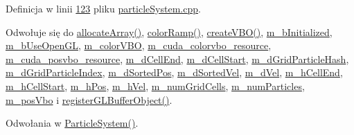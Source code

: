 Definicja w linii \hyperlink{particle_system_8cpp_source_l00123}{123} pliku \hyperlink{particle_system_8cpp_source}{particle\-System.\-cpp}.



Odwołuje się do \hyperlink{particle_system_8cuh_aee51e01a5233e0fda578bd5b3bc38e8f}{allocate\-Array()}, \hyperlink{particle_system_8cpp_source_l00101}{color\-Ramp()}, \hyperlink{particle_system_8cpp_source_l00085}{create\-V\-B\-O()}, \hyperlink{particle_system_8h_source_l00152}{m\-\_\-b\-Initialized}, \hyperlink{particle_system_8h_source_l00152}{m\-\_\-b\-Use\-Open\-G\-L}, \hyperlink{particle_system_8h_source_l00179}{m\-\_\-color\-V\-B\-O}, \hyperlink{particle_system_8h_source_l00185}{m\-\_\-cuda\-\_\-colorvbo\-\_\-resource}, \hyperlink{particle_system_8h_source_l00184}{m\-\_\-cuda\-\_\-posvbo\-\_\-resource}, \hyperlink{particle_system_8h_source_l00174}{m\-\_\-d\-Cell\-End}, \hyperlink{particle_system_8h_source_l00173}{m\-\_\-d\-Cell\-Start}, \hyperlink{particle_system_8h_source_l00171}{m\-\_\-d\-Grid\-Particle\-Hash}, \hyperlink{particle_system_8h_source_l00172}{m\-\_\-d\-Grid\-Particle\-Index}, \hyperlink{particle_system_8h_source_l00167}{m\-\_\-d\-Sorted\-Pos}, \hyperlink{particle_system_8h_source_l00168}{m\-\_\-d\-Sorted\-Vel}, \hyperlink{particle_system_8h_source_l00165}{m\-\_\-d\-Vel}, \hyperlink{particle_system_8h_source_l00161}{m\-\_\-h\-Cell\-End}, \hyperlink{particle_system_8h_source_l00160}{m\-\_\-h\-Cell\-Start}, \hyperlink{particle_system_8h_source_l00156}{m\-\_\-h\-Pos}, \hyperlink{particle_system_8h_source_l00157}{m\-\_\-h\-Vel}, \hyperlink{particle_system_8h_source_l00190}{m\-\_\-num\-Grid\-Cells}, \hyperlink{particle_system_8h_source_l00153}{m\-\_\-num\-Particles}, \hyperlink{particle_system_8h_source_l00178}{m\-\_\-pos\-Vbo} i \hyperlink{particle_system__cuda_8cu_source_l00082}{register\-G\-L\-Buffer\-Object()}.



Odwołania w \hyperlink{particle_system_8cpp_source_l00033}{Particle\-System()}.


